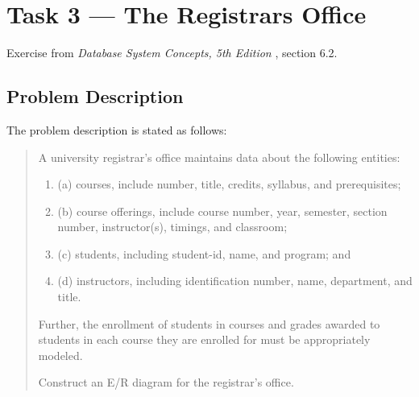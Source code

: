 %
%
%


\section{Task 3 --- The Registrars Office}
Exercise from \emph{Database System Concepts, 5th Edition} \cite{2dv513:dsc},
section 6.2.

\subsection{Problem Description}
The problem description \cite{2dv513:assignment1-instructions} is stated as
follows:

\begin{quote}
  A university registrar's office maintains data about the following entities:

  \begin{enumerate}
    \item
      (a) courses, include number, title, credits, syllabus, and prerequisites;

    \item
      (b) course offerings, include course number, year, semester, section
      number, instructor(s), timings, and classroom;
  
    \item
      (c) students, including student-id, name, and program; and
  
    \item
      (d) instructors, including identification number, name, department, and
      title.
  \end{enumerate}

  Further, the enrollment of students in courses and grades awarded to students
  in each course they are enrolled for must be appropriately modeled.
  
  Construct an E/R diagram for the registrar's office.
\end{quote}



